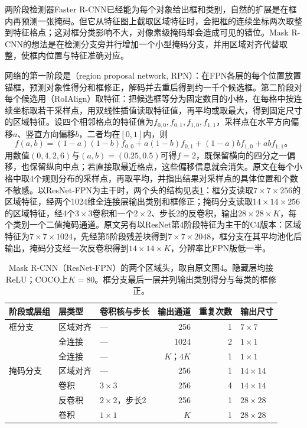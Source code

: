 两阶段检测器Faster R-CNN已经能为每个对象给出框和类别，自然的扩展是在框内再预测一张掩码。但它从特征图上截取区域特征时，会把框的连续坐标两次取整到特征格点；这对框分类影响不大，对像素级掩码却会造成可见的错位。Mask R-CNN的想法是在检测分支旁并行增加一个小型掩码分支，并用区域对齐代替取整，使框内位置与特征准确对应。

网络的第一阶段是（region proposal network, RPN）：在FPN各层的每个位置放置锚框，预测对象性得分和框修正，解码并去重后得到约一千个候选框。第二阶段对每个候选用（RoIAlign）取特征：把候选框等分为固定数目的小格，在每格中按连续坐标取若干采样点，用双线性插值读取特征值，再平均或取最大，得到固定尺寸的区域特征。设四个相邻格点的特征值为$f_{0,0},f_{0,1},f_{1,0},f_{1,1}$，采样点在水平方向偏移$a$、竖直方向偏移$b$，二者均在$[0,1]$内，则
\begin{equation}
 f(a,b)=(1-a)(1-b)f_{0,0}
 +a(1-b)f_{0,1}+(1-a)bf_{1,0}+abf_{1,1}\text{。}
 \label{eq:vision-roialign}
\end{equation}
用数值$(0,4,2,6)$与$(a,b)=(0.25,0.5)$可得$f=2$，既保留横向的四分之一偏移，也保留纵向中点；若直接取最近格点，这些偏移信息就会消失。原文在每个小格中取4个规则分布的采样点，再取平均，并指出结果对采样点的具体位置和个数不敏感。以ResNet-FPN为主干时，两个头的结构见表\ref{tab:vision-recognition-maskrcnn-heads}：框分支读取$7\times7\times256$的区域特征，经两个1024维全连接层输出类别和框修正；掩码分支读取$14\times14\times256$的区域特征，经4个$3\times3$卷积和一个$2\times2$、步长2的反卷积，输出$28\times28\times K$，每个类别一个二值掩码通道。原文另有以ResNet第4阶段特征为主干的C4版本：区域特征为$7\times7\times1024$，先经第5阶段残差块得到$7\times7\times2048$，框分支在其平均池化后输出，掩码分支经一次反卷积得到$14\times14\times K$，分辨率比FPN版低一半。

\begin{table}[tbp]
 \centering
 \small
 \begin{tabular}{@{}lllrrl@{}}
 \toprule
 阶段或层组 & 层类型 & 卷积核与步长 & 输出通道 & 重复次数 & 输出尺寸\\
 \midrule
 框分支 & 区域对齐 & — & 256 & 1 & $7\times7$\\
        & 全连接 & — & 1024 & 2 & $1\times1$\\
        & 全连接 & — & $K$；$4K$ & 1 & $1\times1$\\
 掩码分支 & 区域对齐 & — & 256 & 1 & $14\times14$\\
          & 卷积 & $3\times3$ & 256 & 4 & $14\times14$\\
          & 反卷积 & $2\times2$，步长2 & 256 & 1 & $28\times28$\\
          & 卷积 & $1\times1$ & $K$ & 1 & $28\times28$\\
 \bottomrule
 \end{tabular}
 \caption{Mask R-CNN（ResNet-FPN）的两个区域头，取自原文图4。隐藏层均接ReLU；COCO上$K=80$。框分支最后一层并列输出类别得分与每类的框修正。}
 \label{tab:vision-recognition-maskrcnn-heads}
\end{table}

